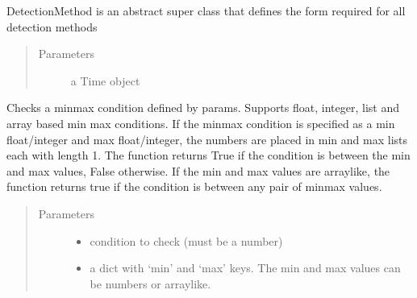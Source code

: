 \documentclass[letterpaper,10pt,english]{sphinxmanual}
\begin{document}
\begin{fulllineitems}
\label{\detokenize{index:feast.DetectionModules.abstract_detection_method.DetectionMethod}}
DetectionMethod is an abstract super class that defines the form required for all detection methods
\begin{quote}\begin{description}
\item[{Parameters}] \leavevmode
{} \textendash{} a Time object

\end{description}\end{quote}

\begin{fulllineitems}
\label{\detokenize{index:feast.DetectionModules.abstract_detection_method.DetectionMethod.check_min_max_condition}}
Checks a min\sphinxhyphen{}max condition defined by params. Supports float, integer, list and array based min max conditions.
If the min\sphinxhyphen{}max condition is specified as a min float/integer and max float/integer, the numbers are placed in
min and max lists each with length 1. The function returns True if the condition is between the min and max
values, False otherwise. If the min and max values are array\sphinxhyphen{}like, the function returns true if the condition is
between any pair of min\sphinxhyphen{}max values.
\begin{quote}\begin{description}
\item[{Parameters}] \leavevmode\begin{itemize}
\item {} 
 \textendash{} condition to check (must be a number)

\item {} 
 \textendash{} a dict with ‘min’ and ‘max’ keys. The min and max values can be numbers or array\sphinxhyphen{}like.


\end{itemize}
\end{description}
\end{quote}
\end{fulllineitems}
\end{fulllineitems}
\end{document}
